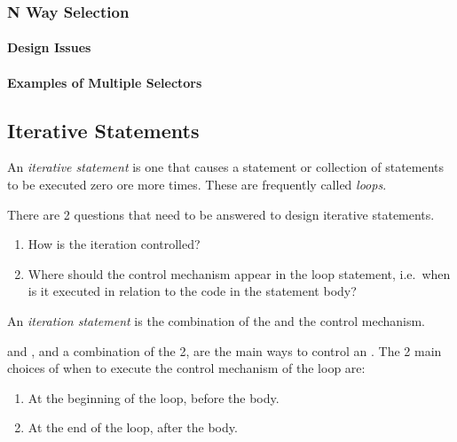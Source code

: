 \subsubsection{N Way Selection}\label{subsubsec:N_Way_Selection}
\paragraph{Design Issues}\label{par:N_Way_Selection-Design_Issues}
\paragraph{Examples of Multiple Selectors}\label{par:N_Way_Selection-Examples}

\subsection{Iterative Statements}\label{subsec:Iterative_Statements}
\begin{definition}\label{def:Iterative_Statement}
  An \emph{iterative statement} is one that causes a statement or collection of statements to be executed zero ore more times.
  These are frequently called \emph{loops}.

  There are 2 questions that need to be answered to design iterative statements.
  \begin{enumerate}[noitemsep]
  \item How is the iteration controlled?
  \item Where should the control mechanism appear in the loop statement, i.e.\ when is it executed in relation to the code in the statement body?
  \end{enumerate}

  \begin{remark}\label{rmk:Iteration_Statement}
    An \emph{iteration statement} is the combination of the  and the control mechanism.
  \end{remark}
\end{definition}

 and , and a combination of the 2, are the main ways to control an .
The 2 main choices of when to execute the control mechanism of the loop are:
\begin{enumerate}[noitemsep]
\item At the beginning of the loop, before the body. 
\item At the end of the loop, after the body. 
\end{enumerate}

